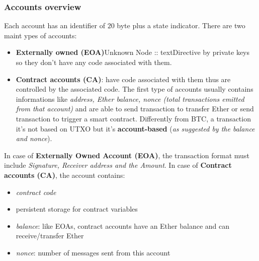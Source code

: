 \documentclass[10pt,a4paper]{report}
\begin{document}
\subsubsection{Accounts overview}\label{sec:accounts-overview}
Each account has an identifier of $20$ byte plus a state indicator. There are two maint ypes of accounts:
\begin{itemize}
	\item 
	\textbf{Externally owned (EOA)}Unknown Node :: textDirective
	by private keys so they don't have any code associated with them.
	\item 
	\textbf{Contract accounts (CA)}: have code associated with them thus are controlled by the associated code.
	The first type of accounts usually contains informations like \textit{address, Ether balance, nonce (total transactions emitted from that account)} and are able to send transaction to transfer Ether or send transaction to trigger a smart contract. Differently from BTC, a transaction it's not based on UTXO but it's \textbf{account-based} (\textit{as suggested by the balance and nonce}).
\end{itemize}

In case of \textbf{Externally Owned Account (EOA)}, the transaction format must include \textit{Signature, Receiver address and the Amount}.
In case of \textbf{Contract accounts (CA)}, the account contains:
\begin{itemize}
	\item 
	\textit{contract code}
	\item 
	persistent storage for contract variables
	\item 
	\textit{balance}: like EOAs, contract accounts have an Ether balance and can receive/transfer Ether
	\item 
	\textit{nonce}: number of messages sent from this account
\end{itemize}
\end{document}
